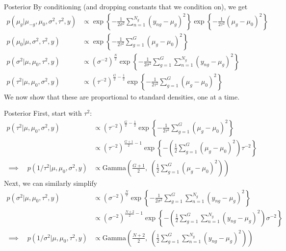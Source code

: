\documentclass[aspectratio=169, handout]{beamer}
\begin{document}
{\footnotesize
\begin{frame}{Posterior}
By conditioning (and dropping constants that we condition on), we get
\begin{align*}
  p(\mu_g|\mu_{-g},\mu_0,\sigma^2, \tau^2,y)
  &\propto
  \exp\left\{
    -
    \frac{1}{2\sigma^2}
    \sum_{n=1}^{N_g}
    (y_{ng}-\mu_g)^2
  \right\}
  \exp\left\{
    -
    \frac{1}{2\tau^2}
    (\mu_g-\mu_0)^2
  \right\}
  \\
  p(\mu_0|\mu,\sigma^2, \tau^2,y)
  &\propto
  \exp\left\{
    -
    \frac{1}{2\tau^2}
    \sum_{g=1}^G
    (\mu_g-\mu_0)^2
  \right\}
  \\
  p(\sigma^2|\mu,\mu_0,\tau^2,y)
  &\propto
  (\sigma^{-2})^{\frac{N}{2}}
  \exp\left\{
    -
    \frac{1}{2\sigma^2}
    \sum_{g=1}^G
    \sum_{n=1}^{N_g}
    (y_{ng}-\mu_g)^2
  \right\}
  \\
  p(\tau^2|\mu,\mu_0,\sigma^2,y)
  &\propto
  (\tau^{-2})^{\frac{G}{2}-\frac{1}{2}}
  \exp\left\{
    -
    \frac{1}{2\tau^2}
    \sum_{g=1}^G
    (\mu_g-\mu_0)^2
  \right\}
\end{align*}
We now show that these are proportional to standard densities, one at a
time.
\end{frame}
}

{\scriptsize
\begin{frame}{Posterior}
First, start with $\tau^2$:
\begin{align*}
  p(\tau^2|\mu,\mu_0,\sigma^2,y)
  &\propto
  (\tau^{-2})^{\frac{G}{2}-\frac{1}{2}}
  \exp\left\{
    -
    \frac{1}{2\tau^2}
    \sum_{g=1}^G
    (\mu_g-\mu_0)^2
  \right\}
  \\
  &\propto
  (\tau^{-2})^{\frac{G+1}{2}-1}
  \exp\left\{
    -
    \left(
    \frac{1}{2}
    \sum_{g=1}^G
    (\mu_g-\mu_0)^2
    \right)
    \tau^{-2}
  \right\}
  \\
  \implies\quad
  p(1/\tau^2|\mu,\mu_0,\sigma^2,y)
  &\propto
  \text{Gamma}\left(
  \frac{G+1}{2}
  ,\;
    \left(
    \frac{1}{2}
    \sum_{g=1}^G
    (\mu_g-\mu_0)^2
    \right)
  \right)
\end{align*}
Next, we can similarly simplify
\begin{align*}
  p(\sigma^2|\mu,\mu_0,\tau^2,y)
  &\propto
  (\sigma^{-2})^{\frac{N}{2}}
  \exp\left\{
    -
    \frac{1}{2\sigma^2}
    \sum_{g=1}^G
    \sum_{n=1}^{N_g}
    (y_{ng}-\mu_g)^2
  \right\}
  \\
  &\propto
  (\sigma^{-2})^{\frac{N+2}{2}-1}
  \exp\left\{
    -
    \left(
    \frac{1}{2}
    \sum_{g=1}^G
    \sum_{n=1}^{N_g}
    (y_{ng}-\mu_g)^2
    \right)
    \sigma^{-2}
  \right\}
  \\
  \implies\quad
  p(1/\sigma^2|\mu,\mu_0,\tau^2,y)
  &\propto
  \text{Gamma}
  \left(
  \frac{N+2}{2},
  \;
    \left(
    \frac{1}{2}
    \sum_{g=1}^G
    \sum_{n=1}^{N_g}
    (y_{ng}-\mu_g)^2
    \right)
  \right)
\end{align*}
\end{frame}
}
\end{document}
